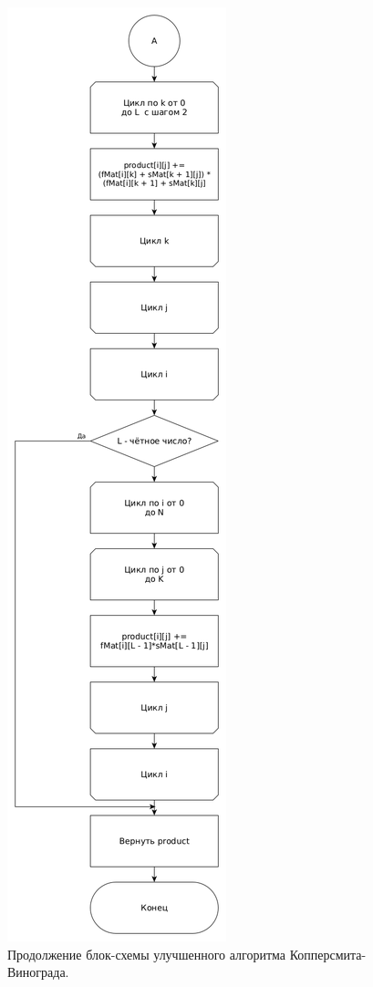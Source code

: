\documentclass[12pt]{report}
\begin{document}
\begin{figure}
\begin{center}
\includegraphics[scale=0.295]{inc/img/WinogradUpdPart2.png}
\captionsetup{justification=centering}
	\caption{Продолжение блок-схемы улучшенного алгоритма Копперсмита-Винограда.}
	\label{img:WinogradUpd2}	
\end{center}
\end{figure}
\end{document}
